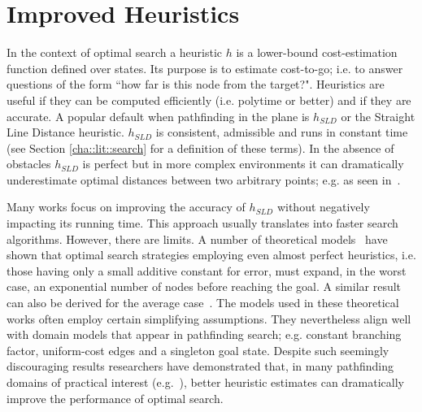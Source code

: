 \section{Improved Heuristics}
\label{cha::lit::heuristics}

%
In the context of optimal search a heuristic $h$ is a lower-bound
cost-estimation function defined over states. Its purpose is to estimate
cost-to-go; i.e. to answer questions of the form ``how far is this node from
the target?".  Heuristics are useful if they can be computed efficiently (i.e.
polytime or better) and if they are accurate.  A popular default when
pathfinding in the plane is $h_{SLD}$ or the Straight Line Distance heuristic.
$h_{SLD}$ is consistent, admissible and runs in constant time (see  Section
\ref{cha::lit::search} for a definition of these terms).  In the absence of
obstacles $h_{SLD}$ is perfect but in more complex environments it can
dramatically underestimate optimal distances between two arbitrary points;
e.g. as seen in~\citep{goldberg05}.

Many works focus on improving the accuracy of $h_{SLD}$ without negatively
impacting its running time. This approach usually translates into faster
search algorithms. However, there are limits.  A number of theoretical
models~\citep{pohl77,helmert08} have shown that optimal search strategies
employing even almost perfect heuristics, i.e. those having only a small
additive constant for error, must expand, in the worst case, an exponential
number of nodes before reaching the goal.  A similar result can also be
derived for the average case~\citep{pearl84}.  The models used in these
theoretical works often employ certain simplifying assumptions.  They
nevertheless align well with domain models that appear in pathfinding search;
e.g. constant branching factor, uniform-cost edges and a singleton goal state.
Despite such seemingly discouraging results researchers have demonstrated
that, in many pathfinding domains of practical interest
(e.g.~\citep{sturtevant12}), better heuristic estimates can dramatically
improve the performance of optimal search.


